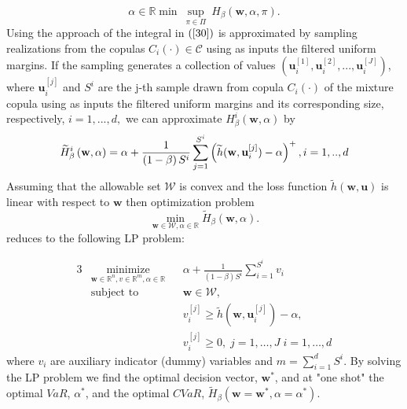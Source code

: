 \documentclass[a4paper,12pt]{report}
\begin{document}
\begin{refsection}
\begin{equation}
{{		\alpha \in
		\mathbb{R}
	}{\min }~\underset{\pi \in \Pi }{\sup }}~H_{\beta }\left( \mathbf{w},\alpha
,\pi \right) .  \label{32}
\end{equation}%
Using the approach of \citet*{rockafellar2000} the integral in $\left( \ref%
{30}\right) $ is approximated by sampling realizations from the copulas $%
C_{i}\left( \cdot \right) \in \mathcal{C}$ using as inputs the filtered
uniform margins. If the sampling generates a collection of values $\left(
\mathbf{u}_{i}^{[1]},\mathbf{u}_{i}^{[2]},...,\mathbf{u}_{i}^{[J]}\right) $,
where $\mathbf{u}_{i}^{[j]}$ and $S^{i}$ are the j-th sample drawn from
copula $C_{i}\left( \cdot \right) $ of the mixture copula using as inputs
the filtered uniform margins and its corresponding size, respectively, $%
i=1,...,d,$ we can approximate $H_{\beta }^{i}\left( \mathbf{w},\alpha
\right) $ by
\begin{equation}
\widetilde{H}_{\beta }^{i}\left( \mathbf{w},\alpha \right) =\alpha +\frac{1}{%
	\left( 1-\beta \right) S^{i}}\sum_{j=1}^{S^{i}}\left( \widetilde{h}(\mathbf{w},\mathbf{u}%
_{i}^{[j]})-\alpha \right) ^{+},i=1,..,d
\end{equation}%
Assuming that the allowable set $\mathcal{W}$ is convex and the loss
function $\widetilde{h}\left( \mathbf{w,u}\right) $ is linear with respect to $\mathbf{w}
$ then optimization problem
\begin{equation}
\underset{\mathbf{w}\in \mathcal{W},\alpha \in
	\mathbb{R}
}{\min }\widetilde{H}_{\beta }\left( \mathbf{w},\alpha \right) .
\end{equation}%
reduces to the following LP problem:

\begin{alignat}{3}
& \underset{\mathbf{w}\in
	\mathbb{R}^{n},v\in
	\mathbb{R}^{m},\alpha \in
	\mathbb{R}}{\text{minimize}}
& & \alpha +\frac{1}{\left( 1-\beta \right)  S^{i}}\sum_{i=1}^{S^{i}}v_{i}
\\ 
& \text{subject to} 
& & \mathbf{w}\in \mathcal{W},\\
&&& v_{i}^{\left[ j\right] }\geq \widetilde{h}(\mathbf{w},\mathbf{u}_{i}^{[j]})-\alpha , \\
&&&v_{i}^{\left[ j\right] }\geq 0, \; j = 1, \ldots, J \;  i = 1, \ldots, d
\end{alignat}
where $v_{i}$ are auxiliary indicator (dummy) variables and $%
m=\sum_{i=1}^{d}S^{i}$. By solving the LP problem we find the optimal
decision vector, $\mathbf{w}^{\ast }$, and at "one shot" the optimal $VaR$, $%
\alpha ^{\ast }$, and the optimal $CVaR$, $\widetilde{H}_{\beta }\left(
\mathbf{w}=\mathbf{w}^{\ast },\alpha =\alpha ^{\ast }\right) $.


\end{refsection}
\end{document}
